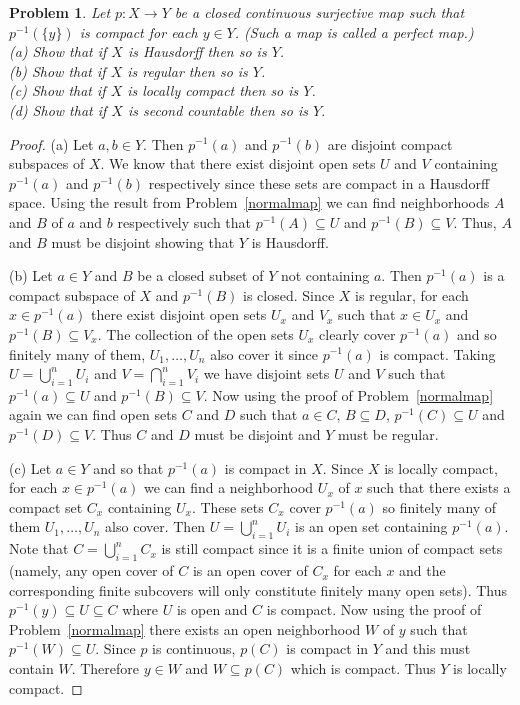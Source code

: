 \documentclass{article}
\newtheorem{problem}{Problem}
\begin{document}
\begin{problem}
Let $p : X \to Y$ be a closed continuous surjective map such that $p^{-1}(\{y\})$ is compact for each $y \in Y$. (Such a map is called a \emph{perfect map}.)\\
(a) Show that if $X$ is Hausdorff then so is $Y$.\\
(b) Show that if $X$ is regular then so is $Y$.\\
(c) Show that if $X$ is locally compact then so is $Y$.\\
(d) Show that if $X$ is second countable then so is $Y$.
\end{problem}
\begin{proof}
(a) Let $a,b \in Y$. Then $p^{-1}(a)$ and $p^{-1}(b)$ are disjoint compact subspaces of $X$. We know that there exist disjoint open sets $U$ and $V$ containing $p^{-1}(a)$ and $p^{-1}(b)$ respectively since these sets are compact in a Hausdorff space. Using the result from Problem~\ref{normalmap} we can find neighborhoods $A$ and $B$ of $a$ and $b$ respectively such that $p^{-1}(A) \subseteq U$ and $p^{-1}(B) \subseteq V$. Thus, $A$ and $B$ must be disjoint showing that $Y$ is Hausdorff.

(b) Let $a \in Y$ and $B$ be a closed subset of $Y$ not containing $a$. Then $p^{-1}(a)$ is a compact subspace of $X$ and $p^{-1}(B)$ is closed. Since $X$ is regular, for each $x \in p^{-1}(a)$ there exist disjoint open sets $U_x$ and $V_x$ such that $x \in U_x$ and $p^{-1}(B) \subseteq V_x$. The collection of the open sets $U_x$ clearly cover $p^{-1}(a)$ and so finitely many of them, $U_1, \dots , U_n$ also cover it since $p^{-1}(a)$ is compact. Taking $U = \bigcup_{i=1}^n U_i$ and $V = \bigcap_{i=1}^n V_i$ we have disjoint sets $U$ and $V$ such that $p^{-1}(a) \subseteq U$ and $p^{-1}(B) \subseteq V$. Now using the proof of Problem~\ref{normalmap} again we can find open sets $C$ and $D$ such that $a \in C$, $B \subseteq D$, $p^{-1}(C) \subseteq U$ and $p^{-1}(D) \subseteq V$. Thus $C$ and $D$ must be disjoint and $Y$ must be regular.

(c) Let $a \in Y$ and so that $p^{-1}(a)$ is compact in $X$. Since $X$ is locally compact, for each $x \in p^{-1}(a)$ we can find a neighborhood $U_x$ of $x$ such that there exists a compact set $C_x$ containing $U_x$. These sets $C_x$ cover $p^{-1}(a)$ so finitely many of them $U_1, \dots , U_n$ also cover. Then $U = \bigcup_{i=1}^n U_i$ is an open set containing $p^{-1}(a)$. Note that $C = \bigcup_{i=1}^n C_x$ is still compact since it is a finite union of compact sets (namely, any open cover of $C$ is an open cover of $C_x$ for each $x$ and the corresponding finite subcovers will only constitute finitely many open sets). Thus $p^{-1}(y) \subseteq U \subseteq C$ where $U$ is open and $C$ is compact. Now using the proof of Problem~\ref{normalmap} there exists an open neighborhood $W$ of $y$ such that $p^{-1}(W) \subseteq U$. Since $p$ is continuous, $p(C)$ is compact in $Y$ and this must contain $W$. Therefore $y \in W$ and $W \subseteq p(C)$ which is compact. Thus $Y$ is locally compact.


\end{proof}
\end{document}
